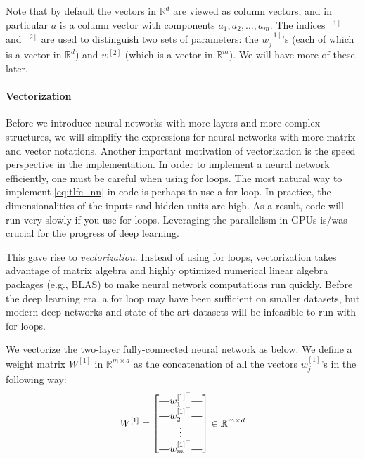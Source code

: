 Note that by default the vectors in $\mathbb R^d$ are viewed as column vectors, and
in particular $a$ is a column vector with components $a_1 ,a_2 ,\ldots,a_m$. The indices
${}^{[1]}$ and ${}^{[2]}$ are used to distinguish two sets of parameters: the $w^{[1]}_j$'s (each of
which is a vector in $\mathbb R^d$) and $w^{[2]}$ (which is a vector in $\mathbb R^m$). We will have
more of these later.

\paragraph{Vectorization} Before we introduce neural networks with more layers and
more complex structures, we will simplify the expressions for neural networks
with more matrix and vector notations. Another important motivation of
vectorization is the speed perspective in the implementation. In order to
implement a neural network efficiently, one must be careful when using for
loops. The most natural way to implement \cref{eq:tlfc_nn} in code is perhaps
to use a for loop. In practice, the dimensionalities of the inputs and hidden
units are high. As a result, code will run very slowly if you use for loops.
Leveraging the parallelism in GPUs is/was crucial for the progress of deep
learning.

This gave rise to \textit{vectorization}. Instead of using for loops, vectorization
takes advantage of matrix algebra and highly optimized numerical linear
algebra packages (e.g., BLAS) to make neural network computations run
quickly. Before the deep learning era, a for loop may have been sufficient
on smaller datasets, but modern deep networks and state-of-the-art datasets
will be infeasible to run with for loops.

We vectorize the two-layer fully-connected neural network as below. We
define a weight matrix $W^{[1]}$ in $\mathbb R^{m \times d}$ as the concatenation of all the vectors
$w^{[1]}_j$'s in the following way:
\begin{equation*}
    W^{[1]} = \begin{bmatrix}
        \horzbar w^{[1]^\top}_1 \horzbar\\
        \horzbar w^{[1]^\top}_2 \horzbar\\
        \vdots\\
        \horzbar w^{[1]^\top}_m \horzbar
    \end{bmatrix} \in \mathbb{R}^{m \times d}
\end{equation*}

